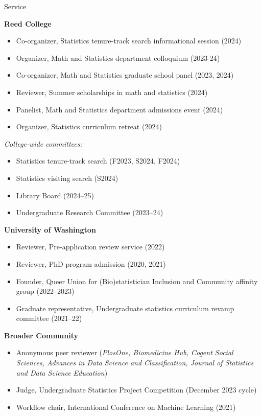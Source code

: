 \documentclass{resume} %
\begin{document}
\begin{rSection}{Service}

\textbf{Reed College}
\begin{itemize}
\item Co-organizer, Statistics tenure-track search informational session (2024)
\item Organizer, Math and Statistics department colloquium (2023-24)
\item Co-organizer, Math and Statistics graduate school panel (2023, 2024)
\item Reviewer, Summer scholarships in math and statistics (2024)
\item Panelist, Math and Statistics department admissions event (2024)
\item Organizer, Statistics curriculum retreat (2024)
\end{itemize}

\textit{College-wide committees:}
\begin{itemize}
\item Statistics tenure-track search (F2023, S2024, F2024)
\item Statistics visiting search (S2024)
\item Library Board (2024--25)
\item Undergraduate Research Committee (2023--24)
\end{itemize}

\textbf{University of Washington}
\begin{itemize}
\item Reviewer, Pre-application review service (2022)
\item Reviewer, PhD program admission (2020, 2021)
\item Founder, Queer Union for (Bio)statistician Inclusion and Community affinity group (2022--2023)
\item Graduate representative, Undergraduate statistics curriculum revamp committee (2021--22)
\end{itemize}

\textbf{Broader Community}
\begin{itemize}
\item Anonymous peer reviewer ({\it PlosOne, Biomedicine Hub, Cogent Social Sciences, Advances in Data Science and Classification, Journal of Statistics and Data Science Education})
\item Judge, Undergraduate Statistics Project Competition (December 2023 cycle)
\item Workflow chair, International Conference on Machine Learning (2021)
\end{itemize}




\end{rSection}
\end{document}
